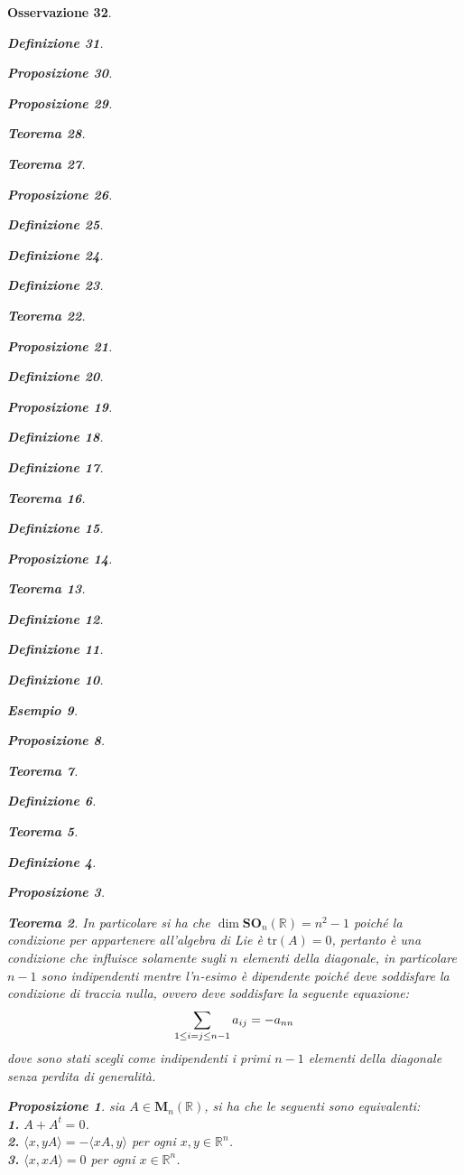\documentclass[oneside, 11pt]{amsbook}
\makeatletter
\newcommand{\0}{{(0)}}
\newcommand{\3}{{(3)}}
\theoremstyle{colonplain}
\newtheorem{thm}{Teorema}[chapter]
\newtheorem{prop}[thm]{Proposizione}
\theoremstyle{colondefinition}
\newtheorem{defn}[thm]{Definizione}
\newtheorem{ex}[thm]{Esempio}
\theoremstyle{colonremark}
\newtheorem{rmk}[thm]{Osservazione}
\numberwithin{equation}{chapter}
\renewcommand{\proofname}{Dimostrazione}
\renewenvironment{proof}[1][\proofname]{\par
  \pushQED{\end{proof}}%
  \normalfont \topsep6\p@\@plus6\p@\relax
  \trivlist
  \item[\hskip\labelsep\bfseries #1:]\ignorespaces
}{%
  \popQED\endtrivlist\@endpefalse
}
\makeatother
\begin{document}
\begin{rmk}
\begin{defn}
\begin{prop}
\begin{prop}
\begin{thm}
\begin{thm}
\begin{prop}
\begin{defn}
\begin{defn}
\begin{defn}
\begin{thm}
\begin{prop}
\begin{defn}
\begin{prop}
\begin{defn}
\begin{defn}
\begin{thm}
\begin{defn}
\begin{prop}
\begin{thm}
\begin{defn}
\begin{defn}
\begin{defn}
\begin{ex}
\begin{prop}
\begin{thm}
\begin{defn}
\begin{thm}
\begin{defn}
\begin{prop}
\begin{proof}
\begin{proof}
\begin{proof}
\begin{proof}
\begin{proof}[Soluzione]
\begin{proof}
\begin{proof}
\begin{thm}
\begin{proof}
In particolare si ha che $\dim \mathbf{SO}_n(\mathbb{R}) = n^2 - 1$ poiché la condizione per appartenere all'algebra di Lie è $\mathrm{tr}(A) = 0$, pertanto è una condizione che influisce solamente sugli $n$ elementi della diagonale, in particolare $n - 1$ sono indipendenti mentre l'$n$-esimo è dipendente poiché deve soddisfare la condizione di traccia nulla, ovvero deve soddisfare la seguente equazione:
\begin{align}
    \sum_{1 \leq i = j \leq n - 1} a_{ij} = - a_{nn} \notag
\end{align}
dove sono stati scegli come indipendenti i primi $n - 1$ elementi della diagonale senza perdita di generalità. \end{proof}
\begin{prop} sia $A \in \mathbf{M}_n(\mathbb{R})$, si ha che le seguenti sono equivalenti: \\
\textbf{1.} $A + A^t = 0$. \\
\textbf{2.} $\langle x, yA \rangle = -\langle xA, y \rangle$ per ogni $x, y \in \mathbb{R}^n$. \\
\textbf{3.} $\langle x, xA \rangle = 0$ per ogni $x \in \mathbb{R}^n$. \\


\end{prop}
\end{thm}
\end{proof}
\end{proof}
\end{proof}
\end{proof}
\end{proof}
\end{proof}
\end{proof}
\end{prop}
\end{defn}
\end{thm}
\end{defn}
\end{thm}
\end{prop}
\end{ex}
\end{defn}
\end{defn}
\end{defn}
\end{thm}
\end{prop}
\end{defn}
\end{thm}
\end{defn}
\end{defn}
\end{prop}
\end{defn}
\end{prop}
\end{thm}
\end{defn}
\end{defn}
\end{defn}
\end{prop}
\end{thm}
\end{thm}
\end{prop}
\end{prop}
\end{defn}
\end{rmk}
\end{document}
